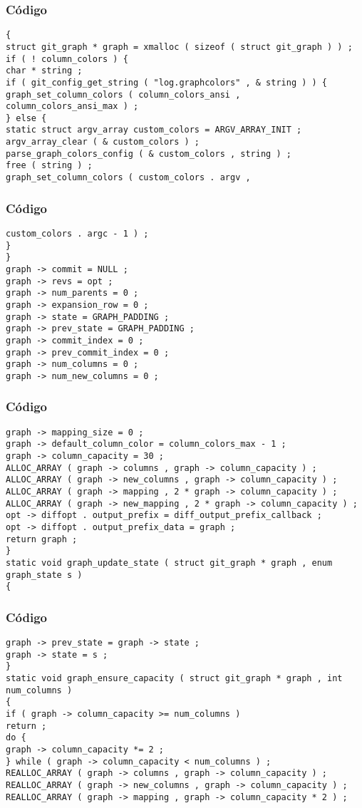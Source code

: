 \documentclass{beamer}
\begin{document}
\begin{frame}[fragile]
\frametitle{C\'odigo}
\begin{verbatim}
{ 
struct git_graph * graph = xmalloc ( sizeof ( struct git_graph ) ) ; 
if ( ! column_colors ) { 
char * string ; 
if ( git_config_get_string ( "log.graphcolors" , & string ) ) { 
graph_set_column_colors ( column_colors_ansi , 
column_colors_ansi_max ) ; 
} else { 
static struct argv_array custom_colors = ARGV_ARRAY_INIT ; 
argv_array_clear ( & custom_colors ) ; 
parse_graph_colors_config ( & custom_colors , string ) ; 
free ( string ) ; 
graph_set_column_colors ( custom_colors . argv , 
\end{verbatim}
\end{frame}
\begin{frame}[fragile]
\frametitle{C\'odigo}
\begin{verbatim}
custom_colors . argc - 1 ) ; 
} 
} 
graph -> commit = NULL ; 
graph -> revs = opt ; 
graph -> num_parents = 0 ; 
graph -> expansion_row = 0 ; 
graph -> state = GRAPH_PADDING ; 
graph -> prev_state = GRAPH_PADDING ; 
graph -> commit_index = 0 ; 
graph -> prev_commit_index = 0 ; 
graph -> num_columns = 0 ; 
graph -> num_new_columns = 0 ; 
\end{verbatim}
\end{frame}
\begin{frame}[fragile]
\frametitle{C\'odigo}
\begin{verbatim}
graph -> mapping_size = 0 ; 
graph -> default_column_color = column_colors_max - 1 ; 
graph -> column_capacity = 30 ; 
ALLOC_ARRAY ( graph -> columns , graph -> column_capacity ) ; 
ALLOC_ARRAY ( graph -> new_columns , graph -> column_capacity ) ; 
ALLOC_ARRAY ( graph -> mapping , 2 * graph -> column_capacity ) ; 
ALLOC_ARRAY ( graph -> new_mapping , 2 * graph -> column_capacity ) ; 
opt -> diffopt . output_prefix = diff_output_prefix_callback ; 
opt -> diffopt . output_prefix_data = graph ; 
return graph ; 
} 
static void graph_update_state ( struct git_graph * graph , enum graph_state s ) 
{ 
\end{verbatim}
\end{frame}
\begin{frame}[fragile]
\frametitle{C\'odigo}
\begin{verbatim}
graph -> prev_state = graph -> state ; 
graph -> state = s ; 
} 
static void graph_ensure_capacity ( struct git_graph * graph , int num_columns ) 
{ 
if ( graph -> column_capacity >= num_columns ) 
return ; 
do { 
graph -> column_capacity *= 2 ; 
} while ( graph -> column_capacity < num_columns ) ; 
REALLOC_ARRAY ( graph -> columns , graph -> column_capacity ) ; 
REALLOC_ARRAY ( graph -> new_columns , graph -> column_capacity ) ; 
REALLOC_ARRAY ( graph -> mapping , graph -> column_capacity * 2 ) ; 
\end{verbatim}
\end{frame}
\end{document}
